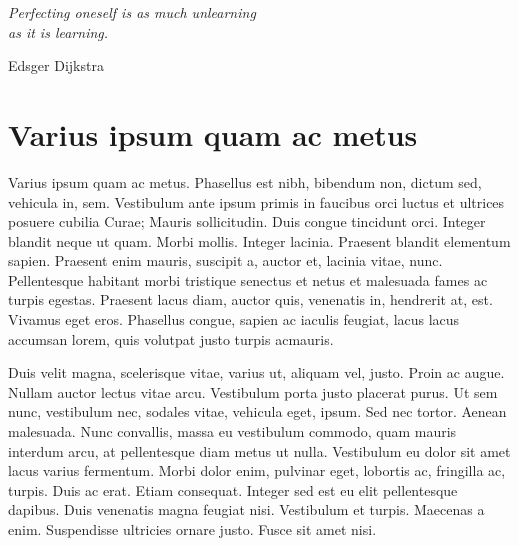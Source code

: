 \documentclass[../hdr.tex]{subfiles}
\begin{document}
\label{chap:mus-rechinfo}

\epigraph{\itshape 
  Perfecting oneself is as much \emph{unlearning} \\
  as it is learning.
}{Edsger Dijkstra}

\ifSubfilesClassLoaded{%
  \setcounter{secnumdepth}{2}
  \setcounter{tocdepth}{2}
  \tableofcontents
  \begin{center}
  \par\noindent\rule{.4\textwidth}{0.4pt}
  \end{center}
}{%
  \minitoc
}
\vskip2cm

\section{Varius ipsum quam ac metus}

Varius ipsum quam ac metus. Phasellus est nibh, bibendum non, dictum sed,
vehicula in, sem. Vestibulum ante ipsum primis in faucibus orci luctus et
ultrices posuere cubilia Curae; Mauris sollicitudin. Duis congue tincidunt orci.
Integer blandit neque ut quam. Morbi mollis. Integer lacinia. Praesent blandit
elementum sapien. Praesent enim mauris, suscipit a, auctor et, lacinia vitae,
nunc. Pellentesque habitant morbi tristique senectus et netus et malesuada fames
ac turpis egestas. Praesent lacus diam, auctor quis, venenatis in, hendrerit at,
est. Vivamus eget eros. Phasellus congue, sapien ac iaculis feugiat, lacus lacus
accumsan lorem, quis volutpat justo turpis ac\footnotemark mauris.

Duis velit magna, scelerisque vitae, varius ut, aliquam vel, justo. Proin ac
augue. Nullam auctor lectus vitae arcu. Vestibulum porta justo placerat purus.
Ut sem nunc, vestibulum nec, sodales vitae, vehicula eget, ipsum. Sed nec
tortor. Aenean malesuada. Nunc convallis, massa eu vestibulum commodo, quam
mauris interdum arcu, at pellentesque diam metus ut nulla. Vestibulum eu dolor
sit amet lacus varius fermentum. Morbi dolor enim, pulvinar eget, lobortis ac,
fringilla ac, turpis. Duis ac erat. Etiam consequat. Integer sed est eu elit
pellentesque dapibus. Duis venenatis magna feugiat nisi. Vestibulum et turpis.
Maecenas a enim. Suspendisse ultricies ornare justo. Fusce sit amet nisi.
\end{document}
